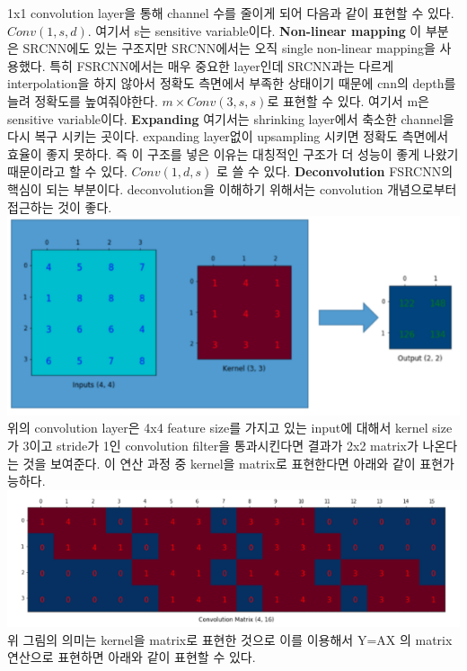 \documentclass[extendedabs]{bmvc2k}
\begin{document}
 1x1 convolution layer을 통해 channel 수를 줄이게 되어 다음과 같이 표현할 수 있다. $Conv(1,s,d)$.
 여기서 s는 sensitive variable이다.
 \newline \quad \textbf{Non-linear mapping} 이 부분은 SRCNN에도 있는 구조지만 SRCNN에서는 오직 single non-linear mapping을 사용했다. 특히 FSRCNN에서는
 매우 중요한 layer인데 SRCNN과는 다르게 interpolation을 하지 않아서 정확도 측면에서 부족한 상태이기 때문에 cnn의 depth를 늘려 정확도를 높여줘야한다.
 $ m \times Conv(3,s,s) $로 표현할 수 있다.
 여기서 m은 sensitive variable이다.
 \newline \quad \textbf{Expanding} 여기서는 shrinking layer에서 축소한 channel을 다시 복구 시키는 곳이다. expanding layer없이 upsampling 시키면 정확도 측면에서 효율이 좋지 못하다.
  즉 이 구조를 넣은 이유는 대칭적인 구조가 더 성능이 좋게 나왔기 때문이라고 할 수 있다. $ Conv(1,d,s) $ 로 쓸 수 있다.
 \newline \quad \textbf{Deconvolution} FSRCNN의 핵심이 되는 부분이다. deconvolution을 이해하기 위해서는 convolution 개념으로부터 접근하는 것이 좋다.
 \newline  \includegraphics[width=\linewidth]{images/03_SR.PNG}
 위의 convolution layer은 4x4 feature size를 가지고 있는 input에 대해서 kernel size가 3이고 stride가 1인 convolution filter을 통과시킨다면 결과가 2x2 matrix가 나온다는 것을 보여준다.
 이 연산 과정 중 kernel을 matrix로 표현한다면 \cite{deconv} 아래와 같이 표현가능하다.
 \newline  \includegraphics[width=\linewidth]{images/04_SR.PNG}
 위 그림의 의미는 kernel을 matrix로 표현한 것으로 이를 이용해서 Y=AX 의 matrix 연산으로 표현하면 아래와 같이 표현할 수 있다. 
\end{document}

